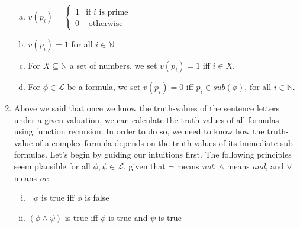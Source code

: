 \begin{enumerate}[\thesection.1]
\begin{enumerate}[(a)]
			\item $v(p_i)=\begin{cases} 1 & \text{if }i\text{ is prime}\\0 & \text{ otherwise}\end{cases}$
			
			\item $v(p_i)=1$ for all $i\in \mathbb{N}$
			
			\item For $X\subseteq \mathbb{N}$ a set of numbers, we set $v(p_i)=1$ iff $i\in X$.
			
			\item For $\phi\in\mathcal{L}$ be a formula, we set $v(p_i)=0$ iff $p_i\in sub(\phi)$, for all $i\in\mathbb{N}$.
			
			 	
		\end{enumerate}
		
	  \item Above we said that once we know the truth-values of the sentence letters under a given valuation, we can calculate the truth-values of all formulas using function recursion.
			In order to do so, we need to know how the truth-value of a complex formula depends on the truth-values of its immediate sub-formulas.
			Let's begin by guiding our intuitions first.
			The following principles seem plausible for all $\phi,\psi\in\mathcal{L}$, given that $\neg$ means \emph{not}, $\land$ means \emph{and}, and $\lor$ means \emph{or}:
		
		\begin{enumerate}[(i)]
						
				\item $\neg\phi$ is true iff $\phi$ is false
					
				\item $(\phi\land\psi)$ is true iff $\phi$ is true and $\psi$ is true					
						

\end{enumerate}
\end{enumerate}
